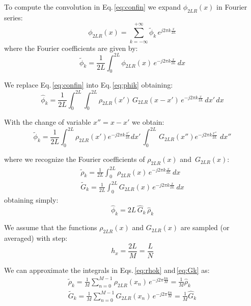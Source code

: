 To compute the convolution in Eq.\,\ref{eq:confin} we expand $\phi_{2LR}(x)$ in Fourier series:
\begin{equation}
\phi_{2LR}(x) = \sum_{k=-\infty}^{+\infty} \tilde{\phi}_k\, e^{j2\pi k \frac{x}{2L}}
\label{eq:phifour}
\end{equation}
where the Fourier coefficients are given by:
\begin{equation}
\tilde{\phi}_k = \frac{1}{2L}\int_0^{2L} \phi_{2LR}(x)\, e^{-j2\pi k \frac{x}{2L}} \, dx
\label{eq:phik}
\end{equation}

We replace Eq.\,\eqref{eq:confin} into Eq.\,\eqref{eq:phik} obtaining:
\begin{equation}
\hat{\phi}_k = \frac{1}{2L}\int_0^{2L} \int_{0 }^{2L} 
\rho_{2LR}(x')\,G_{2LR}(x-x') \, e^{-j2\pi k \frac{x}{2L}} \,  dx'\, dx
\end{equation}

With the change of variable $x'' = x-x'$ we obtain:
\begin{equation}
\tilde{\phi}_k = 
\frac{1}{2L}
\int_0^{2L} 
\rho_{2LR}(x') e^{-j2\pi k \frac{x'}{2L}}dx'\,
\int_{0 }^{2L} 
\,G_{2LR}(x'') e^{-j2\pi k \frac{x''}{2L}}\,  \,  dx''
\end{equation}

where we recognize the Fourier coefficients of $\rho_{2LR}(x)$ and $\,G_{2LR}(x)$:
\begin{align}
\tilde{\rho}_k = \frac{1}{2L}\int_0^{2L} \rho_{2LR}(x)\, e^{-j2\pi k \frac{x}{2L}} \, dx \label{eq:rhok}\\
\tilde{G}_k = \frac{1}{2L}\int_0^{2L} G_{2LR}(x)\, e^{-j2\pi k \frac{x}{2L}} \, dx \label{eq:Gk}
\end{align}
obtaining simply:
\begin{equation}
\hat{\phi}_k = 2L \, \hat{G}_k \, \hat{\rho}_k
\label{eq:freqconv}
\end{equation}

We assume that the functions $\rho_{2LR}(x)$ and  $G_{2LR}(x)$ are sampled (or averaged) with step:
\begin{equation}
h_x = \frac{2L}{M} = \frac{L}{N}
\end{equation}

We can approximate the integrals in Eqs.\,\eqref{eq:rhok} and\,\eqref{eq:Gk} as:
\begin{align}
\tilde{\rho}_k = \frac{1}{M}\sum_{n=0}^{M-1} \rho_{2LR}(x_n)\, e^{-j2\pi  \frac{kn}{M}}  
= \frac{1}{M} \hat{\rho}_k
\label{eq:rhokfft}\\
\tilde{G}_k = \frac{1}{M}\sum_{n=0}^{M-1} G_{2LR}(x_n)\, e^{-j2\pi  \frac{kn}{M}} 
= \frac{1}{M} \hat{G}_k\label{eq:Gkfft}
\end{align}

